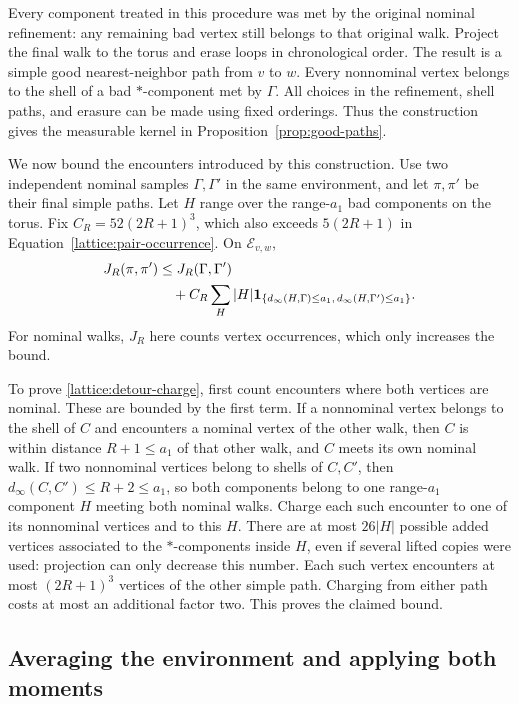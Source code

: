 Every component treated in this procedure was met by the original
nominal refinement: any remaining bad vertex still belongs to that
original walk.  Project the final walk to the torus and erase loops
in chronological order.  The result is a simple good nearest-neighbor
path from $v$ to $w$.  Every nonnominal vertex belongs to the shell of
a bad $*$-component met by $\Gamma$.  All choices in the refinement,
shell paths, and erasure can be made using fixed orderings.  Thus the
construction gives the measurable kernel in Proposition~\ref{prop:good-paths}.

We now bound the encounters introduced by this construction.  Use two
independent nominal samples $\Gamma,\Gamma'$ in the same environment,
and let $\pi,\pi'$ be their final simple paths.  Let $H$ range over
the range-$a_1$ bad components on the torus. Fix
$C_R=52(2R+1)^3$, which also exceeds $5(2R+1)$ in
Equation~\eqref{lattice:pair-occurrence}. On $\mathcal E_{v,w}$,
\begin{align}\label{lattice:detour-charge}
 J_R(\pi,\pi')
 &\le J_R(\Gamma,\Gamma')\notag\\
 &\quad+C_R\sum_H |H|
       \mathbf 1_{\{d_\infty(H,\Gamma)\le a_1,\,
                  d_\infty(H,\Gamma')\le a_1\}}.
\end{align}
For nominal walks, $J_R$ here counts vertex occurrences, which only
increases the bound.

To prove \eqref{lattice:detour-charge}, first count encounters where both
vertices are nominal.  These are bounded by the first term.  If a
nonnominal vertex belongs to the shell of $C$ and encounters a nominal
vertex of the other walk, then $C$ is within distance $R+1\le a_1$
of that other walk, and $C$ meets its own nominal walk.  If two
nonnominal vertices belong to shells of $C,C'$, then
$d_\infty(C,C')\le R+2\le a_1$, so both components belong to one
range-$a_1$ component $H$ meeting both nominal walks.  Charge each
such encounter to one of its nonnominal vertices and to this $H$.
There are at most $26|H|$ possible added vertices associated to the
$*$-components inside $H$, even if several lifted copies were used:
projection can only decrease this number.  Each such vertex encounters
at most $(2R+1)^3$ vertices of the other simple path.  Charging from
either path costs at most an additional factor two.  This proves the
claimed bound.

\subsection{Averaging the environment and applying both moments}

